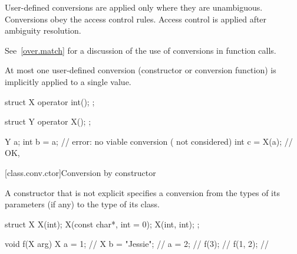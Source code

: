 \pnum
User-defined conversions are applied only where they are unambiguous.
Conversions obey the access control rules.
Access control is applied after ambiguity resolution.

\pnum
\begin{note}
See~\ref{over.match} for a discussion of the use of conversions in function calls.
\end{note}

\pnum
{}%
At most one user-defined conversion (constructor or conversion function)
is implicitly applied to a single value.
\begin{example}
\begin{codeblock}
struct X {
  operator int();
};

struct Y {
  operator X();
};

Y a;
int b = a;          // error: no viable conversion ( not considered)
int c = X(a);       // OK, 
\end{codeblock}
\end{example}

[class.conv.ctor]{Conversion by constructor}%
%

\pnum
A constructor that is not explicit
specifies a conversion from
the types of its parameters (if any)
to the type of its class.
\begin{example}
%
\begin{codeblock}
struct X {
    X(int);
    X(const char*, int = 0);
    X(int, int);
};

void f(X arg) {
  X a = 1;          // 
  X b = "Jessie";   // 
  a = 2;            // 
  f(3);             // 
  f({1, 2});        // 
}
\end{codeblock}
\end{example}

